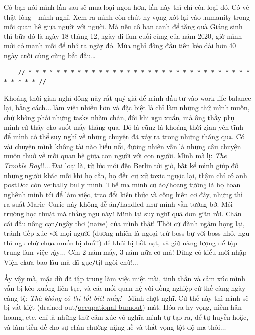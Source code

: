 \documentclass[12pt]{article}
\begin{document}
Cô bạn nói mình lần sau sẽ mua loại ngon hơn, lần này thì chỉ còn loại đó. Có vẻ thật lòng - mình nghĩ. Xem ra mình còn chút hy vọng xót lại vào humanity trong mối quan hệ giữa người với người. Mà nếu cô bạn canh để tặng quà Giáng sinh thì bữa đó là ngày 18 tháng 12, ngày đi làm cuối cùng của năm 2020, giờ mình mới có manh mối để nhớ ra ngày đó. Mùa nghỉ đông đầu tiên kéo dài hơn 40 ngày cuối cùng cũng bắt đầu\ldots

\begin{verbatim}
	// * * * * * * * * * * * * * * * * * * * * * * * * * * * * * * * * * * * * * //
\end{verbatim}

\noindent
{} Khoảng thời gian nghỉ đông này rất quý giá để mình đầu tư vào work-life balance lại, bằng cách$\ldots$ làm việc nhiều hơn và đặc biệt là chỉ làm những thứ mình muốn, chứ không phải những tasks nhàm chán, đôi khi ngu xuẩn, mà ông thầy phụ mình cứ thảy cho suốt mấy tháng qua. Đó là cũng là khoảng thời gian yên tĩnh để mình có thể suy nghĩ về những chuyện đã xảy ra trong những tháng qua. Có vài chuyện mình không tài nào hiểu nổi, đương nhiên vẫn là những câu chuyện muôn thuở về mối quan hệ giữa con người với con người. Mình mà lị: {\it The Trouble Boy}!!$\ldots$ Đại loại là, từ lúc mới đến Berlin tới giờ, bất kể mình giúp đỡ những người khác mỗi khi họ cần, họ đều cư xử toxic ngược lại, thậm chí có anh postDoc còn verbally bully mình. Thế mà mình cứ ảo{\tt/}hoang tưởng là họ hoan nghênh mình tới để làm việc, trao đổi kiến thức và cống hiến cơ đấy, nhưng thì ra suất Marie--Curie này không dễ ăn{\tt/}handled như mình vẫn tưởng bở. Môi trường học thuật mà thằng ngu này! Mình lại suy nghĩ quá đơn giản rồi. Chán cái đầu nông cạn{\tt/}ngây thơ (naive) của mình thật! Thôi cứ đành ngậm họng lại, tránh tiếp xúc với mọi người (đương nhiên là ngoại trừ boss bự với boss nhỏ, ngu thì ngu chứ chưa muốn bị đuổi!) để khỏi bị bắt nạt, và giữ năng lượng để tập trung làm việc vậy$\ldots$ Còn 2 năm mấy, 3 năm nữa cơ mà! Đừng có kiểu mới nhập Viện chưa bao lâu mà đã gục{\tt/}tịt ngòi chứ!$\ldots$

Ấy vậy mà, mặc dù đã tập trung làm việc miệt mài, tinh thần và cảm xúc mình vẫn bị kéo xuống liên tục, và các mối quan hệ với đồng nghiệp cứ thế càng ngày càng tệ: {\it Thà không có thì tốt biết mấy!} - Mình chợt nghĩ. Cứ thế này thì mình sẽ bị vắt kiệt (drained out{\tt/}\href{https://en.wikipedia.org/wiki/Occupational_burnout}{occupational burnout}) mất. Hóa ra hy vọng, niềm hân hoang, etc. chỉ là những thứ cảm xúc vô nghĩa mình tự tạo ra, để tự huyễn hoặc, và làm tiền đề cho sự chán chường nặng nề và thất vọng tột độ mà thôi$\ldots$
\end{document}
